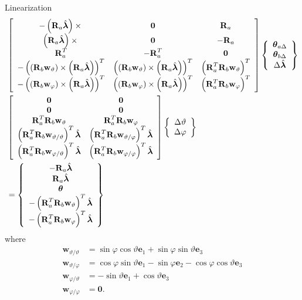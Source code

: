 \documentclass[10pt,dvips,fleqn,subeqn]{report}
\newcommand{\T}[1]{\bm{\mathbf{#1}}}
\begin{document}
Linearization
\begin{align}
	& \sqbr{\matr{ccc}{
		-\plbr{\T{R}_a \hat{\T{\lambda}}}\times{} & \T{0} & \T{R}_a \\
%
		\plbr{\T{R}_a \hat{\T{\lambda}}}\times{} & \T{0} & -\T{R}_a \\
%
		\T{R}_a^T & -\T{R}_a^T & \T{0} \\
%
		- \plbr{\plbr{\T{R}_b \T{w}_{\vartheta}}\times\plbr{\T{R}_a \hat{\T{\lambda}}}}^T
			& \plbr{\plbr{\T{R}_b \T{w}_{\vartheta}}\times\plbr{\T{R}_a \hat{\T{\lambda}}}}^T
			& \plbr{\T{R}_a^T \T{R}_b \T{w}_{\vartheta}}^T \\
%
		- \plbr{\plbr{\T{R}_b \T{w}_{\varphi}}\times\plbr{\T{R}_a \hat{\T{\lambda}}}}^T
			& \plbr{\plbr{\T{R}_b \T{w}_{\varphi}}\times\plbr{\T{R}_a \hat{\T{\lambda}}}}^T
			& \plbr{\T{R}_a^T \T{R}_b \T{w}_{\varphi}}^T
	}} \cubr{\cvvect{
		\T{\theta}_{a\Delta} \\
		\T{\theta}_{b\Delta} \\
		\Delta\hat{\T{\lambda}} \\
	}} \nonumber \\
	& \sqbr{\matr{cc}{
		\T{0} & \T{0} \\
%
		\T{0} & \T{0} \\
%
		\T{R}_a^T \T{R}_b \T{w}_{\vartheta}
			& \T{R}_a^T \T{R}_b \T{w}_{\varphi} \\
%
		\plbr{\T{R}_a^T \T{R}_b \T{w}_{\vartheta/\vartheta}}^T \hat{\T{\lambda}}
		& \plbr{\T{R}_a^T \T{R}_b \T{w}_{\vartheta/\varphi}}^T \hat{\T{\lambda}} \\
%
		\plbr{\T{R}_a^T \T{R}_b \T{w}_{\varphi/\vartheta}}^T \hat{\T{\lambda}}
		& \plbr{\T{R}_a^T \T{R}_b \T{w}_{\varphi/\varphi}}^T \hat{\T{\lambda}}
	}} \cubr{\cvvect{
		\Delta\vartheta \\
		\Delta\varphi
	}} \nonumber \\
	&= \cubr{\cvvect{
		-\T{R}_a \hat{\T{\lambda}} \\
		\T{R}_a \hat{\T{\lambda}} \\
		\T{\theta} \\
		- \plbr{\T{R}_a^T \T{R}_b \T{w}_{\vartheta}}^T \hat{\T{\lambda}} \\
		- \plbr{\T{R}_a^T \T{R}_b \T{w}_{\varphi}}^T \hat{\T{\lambda}}
	}}
\end{align}
where
\begin{subequations}
\begin{align}
	\T{w}_{\vartheta/\vartheta}
	&= \sin\varphi \cos\vartheta \T{e}_1
	+ \sin\varphi \sin\vartheta \T{e}_3 \\
	\T{w}_{\vartheta/\varphi}
	&= \cos\varphi \sin\vartheta \T{e}_1
	- \sin\varphi \T{e}_2
	- \cos\varphi \cos\vartheta \T{e}_3 \\
	\T{w}_{\varphi/\vartheta}
	&= - \sin\vartheta \T{e}_1 + \cos\vartheta \T{e}_3 \\
	\T{w}_{\varphi/\varphi}
	&= \T{0} .
\end{align}
\end{subequations}
\end{document}
